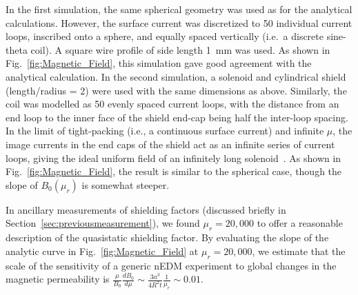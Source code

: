 In the first simulation,
the same spherical geometry was used as for the analytical
calculations.  However, the surface current was discretized to 50
individual current loops, inscribed onto a sphere, and equally spaced
vertically (i.e.~a discrete sine-theta coil).  A square wire profile
of side length 1~mm was used.  As shown in
Fig.~\ref{fig:Magnetic_Field}, this simulation gave good agreement
with the analytical calculation.
%
In the second simulation, a solenoid  and cylindrical shield (length/radius = 2) were used with the same dimensions as above.
Similarly, the coil was modelled as 50 evenly spaced current loops, 
with the distance from an end loop to the inner face of the
shield end-cap being half the inter-loop spacing.  In the limit of tight-packing 
(i.e., a continuous surface current) and  infinite $\mu$, the image currents in the end caps of
the shield act as an infinite series of current loops, giving the ideal uniform field of an 
infinitely  long
solenoid~\cite{bib:lambert,bib:sumner}.
As shown in Fig.~\ref{fig:Magnetic_Field}, the result is similar to the spherical case, though the slope of $B_0(\mu_r)$ is
somewhat steeper.

In ancillary measurements of shielding factors (discussed briefly in
Section~\ref{sec:previousmeasurement}), we found $\mu_r=20,000$ to
offer a reasonable description of the quasistatic shielding factor. By
evaluating the slope of the analytic curve in Fig.~\ref{fig:Magnetic_Field} at
$\mu_r=20,000$, we estimate that the scale of the sensitivity of a
generic nEDM experiment to global changes in the magnetic permeability
is $\frac{\mu}{B_0}\frac{dB_0}{d\mu} \sim \frac{3 a^3 }{4R^2 t} \frac{1}{\mu_r} \sim 0.01$.



